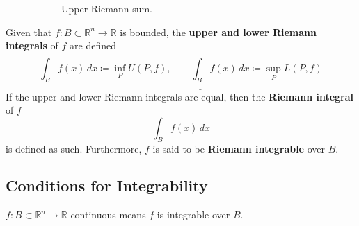 \begin{definition}
\begin{figure}[H]
\begin{subfigure}[b]{0.48\textwidth}
        \caption{Upper Riemann sum.}
        \label{fig:upper_riemann_rum}
      \end{subfigure}
      \caption{}
    \end{figure}
  \end{definition}

  \begin{definition}
    Given that $f: B \subset \mathbb{R}^n \to \mathbb{R}$ is bounded, the \textbf{upper and lower Riemann integrals} of $f$ are defined 
    \begin{equation}
      \overline{\int_B} f(x) \,dx \coloneqq \inf_P U(P, f), \qquad \underline{\int_B} f(x) \,dx \coloneqq \sup_P L(P, f) 
    \end{equation}
    If the upper and lower Riemann integrals are equal, then the \textbf{Riemann integral} of $f$ 
    \begin{equation}
      \int_B f(x) \,dx 
    \end{equation}
    is defined as such. Furthermore, $f$ is said to be \textbf{Riemann integrable} over $B$. 
  \end{definition} 

\subsection{Conditions for Integrability} 

  \begin{theorem}[]
    $f: B \subset \mathbb{R}^n \to \mathbb{R}$ continuous means $f$ is integrable over $B$. 
  \end{theorem}

